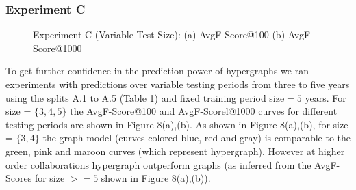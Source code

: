 \documentclass{sig-alternate}
\begin{document}
\subsubsection{Experiment C}

\begin{figure}
\centering
{} 
\caption{Experiment C (Variable Test Size): (a) AvgF-Score@100 (b) AvgF-Score@1000}
\label{fig:EXPB}
\vspace{-1.6em}
\end{figure}

To get further confidence in the prediction power of hypergraphs we ran experiments with predictions over variable testing periods from three to five years using the splits A.1 to A.5 (Table 1) and fixed training period size$=5$ years. For size = $\{3,4,5\}$ the AvgF-Score@100 and AvgF-Scorel@1000 curves for different testing periods are shown in Figure 8(a),(b). As shown in Figure 8(a),(b), for size = $\{3,4\}$ the graph model (curves colored blue, red and gray) is comparable to the green, pink and maroon curves (which represent hypergraph). However at higher order collaborations hypergraph outperform graphs (as inferred from the AvgF-Scores for size $>=5$ shown in Figure 8(a),(b)).


\end{document}
